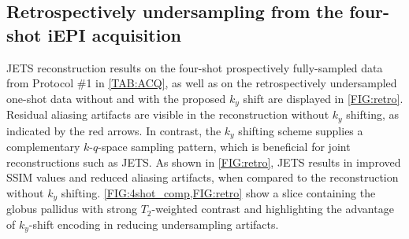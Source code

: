 \documentclass[preprint,12pt,authoryear,review]{elsarticle}
\begin{document}
    \subsection{Retrospectively undersampling from the four-shot iEPI acquisition}

    JETS reconstruction results on
    the four-shot prospectively fully-sampled data
    from Protocol \#1 in \cref{TAB:ACQ},
    as well as on the retrospectively undersampled one-shot data
    without and with the proposed $k_y$ shift
    are displayed in \cref{FIG:retro}.
    Residual aliasing artifacts are visible in the reconstruction
    without $k_y$ shifting, as indicated by the red arrows.
    In contrast, the $k_y$ shifting scheme supplies a complementary
    $k$-$q$-space sampling pattern,
    which is beneficial for joint reconstructions such as JETS.
    As shown in \cref{FIG:retro}, JETS results in
    improved SSIM values and reduced aliasing artifacts,
    when compared to the reconstruction without $k_y$ shifting.
    \cref{FIG:4shot_comp,FIG:retro} show a slice
    containing the globus pallidus with strong $T_2$-weighted contrast and
    highlighting the advantage of $k_y$-shift encoding
    in reducing undersampling artifacts.
\end{document}
